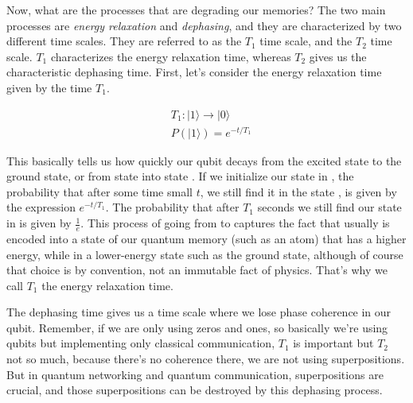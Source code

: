 Now, what are the processes that are degrading our memories? The two main processes are \emph{energy relaxation} and \emph{dephasing}, and they are characterized by two different time scales. They are referred to as the $T_1$ time scale, and the $T_2$ time scale.  $T_1$ characterizes the energy relaxation time, whereas  $T_2$ gives us the characteristic dephasing time. First, let's consider the energy relaxation time given by the time  $T_1$.

\begin{equation}
\begin{aligned}
&T_1:|1\rangle \rightarrow|0\rangle \\
&P(|1\rangle)=e^{-t / T_1}
\end{aligned}
\end{equation}

This basically tells us how quickly our qubit decays from the excited state to the ground state, or from state  into state . If we initialize our state in , the probability that after some time small $t$, we still find it in the state , is given by the expression $e^{-t/T_1}$. The probability that after $T_1$ seconds we still find our state in  is given by $\frac{1}{e}$. This process of going from  to  captures the fact that usually  is encoded into a state of our quantum memory (such as an atom) that has a higher energy, while  in a lower-energy state such as the ground state, although of course that choice is by convention, not an immutable fact of physics.  That's why we call $T_1$ the energy relaxation time.

\rdv{}
The dephasing time gives us a time scale where we lose phase coherence in our qubit. Remember, if we are only using zeros and ones, so basically we're using qubits but implementing only classical communication,  $T_1$ is important but  $T_2$ not so much, because there's no coherence there, we are not using superpositions. But in quantum networking and quantum communication, superpositions are crucial, and those superpositions can be destroyed by this dephasing process.

